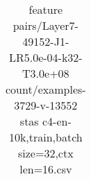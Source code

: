 \begin{table}
\begin{longtable}{lrl}
\bottomrule
\end{longtable}
\caption{feature pairs/Layer7-49152-J1-LR5.0e-04-k32-T3.0e+08 count/examples-3729-v-13552 stas c4-en-10k,train,batch size=32,ctx len=16.csv}
\end{table}